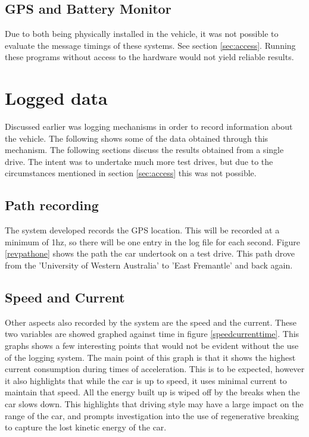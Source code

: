 \subsection{GPS and Battery Monitor}

Due to both being physically installed in the vehicle, it was not possible to evaluate the message timings of these systems. See section \ref{sec:access}. Running these programs without access to the hardware would not yield reliable results.

\section{Logged data}

Discussed earlier was logging mechanisms in order to record information about the vehicle. The following shows some of the data obtained through this mechanism. The following sections discuss the results obtained from a single drive. The intent was to undertake much more test drives, but due to the circumstances mentioned in section \ref{sec:access} this was not possible.

\subsection{Path recording}

The system developed records the GPS location. This will be recorded at a minimum of 1hz, so there will be one entry in the log file for each second. Figure \ref{revpathone} shows the path the car undertook on a test drive. This path drove from the 'University of Western Australia' to 'East Fremantle' and back again.


\subsection{Speed and Current}

Other aspects also recorded by the system are the speed and the current. These two variables are showed graphed against time in figure \ref{speedcurrenttime}. This graphs shows a few interesting points that would not be evident without the use of the logging system. The main point of this graph is that it shows the highest current consumption during times of acceleration. This is to be expected, however it also highlights that while the car is up to speed, it uses minimal current to maintain that speed. All the energy built up is wiped off by the breaks when the car slows down. This highlights that driving style may have a large impact on the range of the car, and prompts investigation into the use of regenerative breaking to capture the lost kinetic energy of the car.

